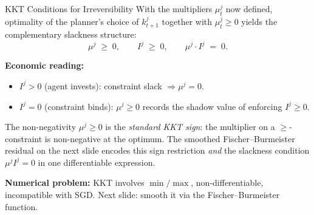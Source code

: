 \documentclass[aspectratio=169,11pt]{beamer}
\newcommand{\emphc}[1]{\textcolor{harvardcrimson}{#1}}
\begin{document}
\begin{frame}{KKT Conditions for Irreversibility}
With the multipliers $\mu_t^j$ now defined, optimality of the planner's choice of $k_{t+1}^j$ together with $\mu_t^j \geq 0$ yields the \emphc{complementary slackness} structure:
\[
\mu^j \;\geq\; 0, \qquad I^j \;\geq\; 0, \qquad \mu^j \cdot I^j \;=\; 0.
\]

\smallskip
\textbf{Economic reading:}
\begin{itemize}\itemsep2pt
    \item $I^j > 0$ (agent invests): constraint slack $\Rightarrow \mu^j = 0$.
    \item $I^j = 0$ (constraint binds): $\mu^j \geq 0$ records the shadow value of enforcing $I^j \geq 0$.
\end{itemize}

\vspace{0.2em}
{\footnotesize The non-negativity $\mu^j \geq 0$ is the \emph{standard KKT sign}: the multiplier on a $\geq$-constraint is non-negative at the optimum.  The smoothed Fischer--Burmeister residual on the next slide encodes this sign restriction \emph{and} the slackness condition $\mu^j I^j = 0$ in one differentiable expression.}

\vspace{0.3em}
\textbf{Numerical problem:} KKT involves $\min/\max$, \emphc{non-differentiable}, incompatible with SGD. Next slide: smooth it via the Fischer--Burmeister function.
\end{frame}
\end{document}
